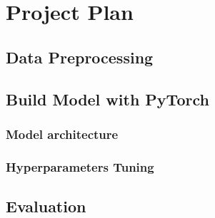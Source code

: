\documentclass[12pt,twoside]{report}
\begin{document}
\chapter{Project Plan}

\section{Data Preprocessing}

\section{Build Model with PyTorch}
\subsection{Model architecture}
\subsection{Hyperparameters Tuning}

\section{Evaluation}








\end{document}
